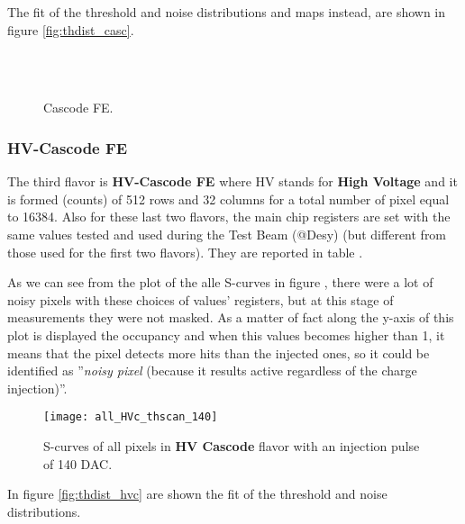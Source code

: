 The fit of the threshold and noise distributions and maps instead, are shown in figure \vref{fig:thdist_casc}.


\begin{figure}[h!]
\centering
{}\quad
{}\\
\quad
{}\\
\caption{Cascode FE.}
\label{fig:norm}
\end{figure}




\subsubsection{HV-Cascode FE}


The third flavor is \textbf{HV-Cascode FE} where HV stands for \textbf{High Voltage} and it is formed (counts) of 512 rows and 32 columns for a total number of pixel equal to 16384. Also for these last two flavors, the main chip registers are set with the same values tested and used during the Test Beam (@Desy) (but different from those used for the first two flavors). They are reported in table  .

As we can see from the plot of the alle S-curves in figure , there were a lot of noisy pixels with these choices of values' registers, but at this stage of measurements they were not masked.
As a matter of fact along the y-axis of this plot is displayed the occupancy and when this values becomes higher than 1, it means that the pixel detects more hits than the injected ones, so it could be identified as ''\textit{noisy pixel} (because it results active regardless of the charge injection)''.


\begin{figure}[h!]
\centering
\texttt{[image: all\_HVc\_thscan\_140]}
\caption{S-curves of all pixels in \textbf{HV Cascode} flavor with an injection pulse of 140 DAC.}
\label{fig:hvc_scurve_140}
\end{figure}

In figure \vref{fig:thdist_hvc} are shown the fit of the threshold and noise distributions.

